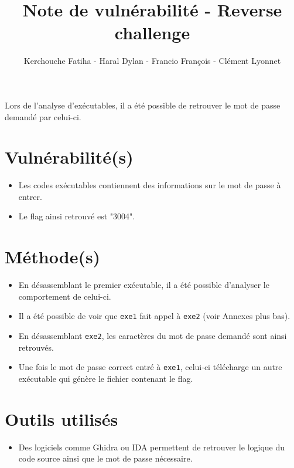 \documentclass[12pt]{article}
\begin{document}
  \title{Note de vulnérabilité - Reverse challenge}
  \author{Kerchouche Fatiha - Haral Dylan - Francio François - Clément Lyonnet}
  \date{}
  \maketitle

  Lors de l'analyse d'exécutables, il a été possible de retrouver le mot de passe demandé par celui-ci.

  \section{Vulnérabilité(s)}
  \begin{itemize}
    \item Les codes exécutables contiennent des informations sur le mot de passe à entrer.
    \item Le flag ainsi retrouvé est "3004".
  \end{itemize}

  \section{Méthode(s)}
  \begin{itemize}
    \item En désassemblant le premier exécutable, il a été possible d'analyser le comportement de celui-ci.
    \item Il a été possible de voir que \texttt{exe1} fait appel à \texttt{exe2} (voir Annexes plus bas).
    \item En désassemblant \texttt{exe2}, les caractères du mot de passe demandé sont ainsi retrouvés.
    \item Une fois le mot de passe correct entré à \texttt{exe1}, celui-ci télécharge un autre exécutable qui génère le fichier contenant le flag.
  \end{itemize}

  \newpage

  \section{Outils utilisés}
  \begin{itemize}
    \item Des logiciels comme Ghidra ou IDA permettent de retrouver le logique du code source ainsi que le mot de passe nécessaire.
  \end{itemize}
\end{document}
